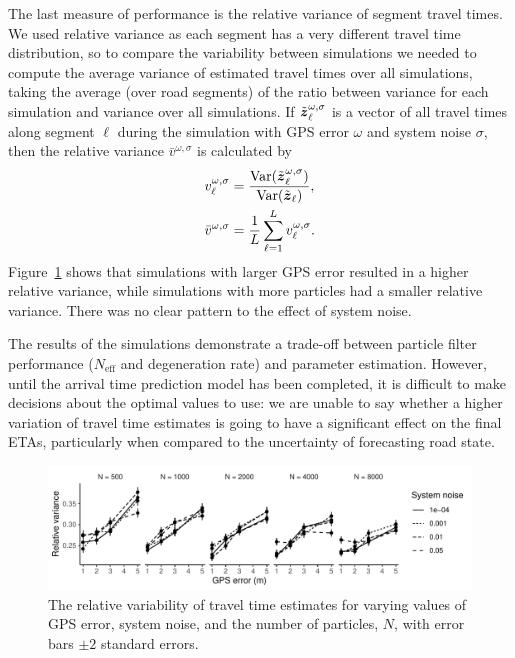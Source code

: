 The last measure of performance is the relative variance of segment travel times.
We used relative variance as each segment has a very different travel time distribution,
so to compare the variability between simulations we needed to
compute the average variance of estimated travel times over all simulations,
taking the average (over road segments) of the ratio between variance for
each simulation and variance over all simulations.
If $\tilde {\boldsymbol{z}}_\ell^{\omega,\sigma}$ is a vector of all travel times
along segment $\ell$ during the simulation with GPS error $\omega$ and system noise $\sigma$,
then the relative variance $\bar v^{\omega,\sigma}$ is calculated by
\begin{equation*}
\begin{split}
v_\ell^{\omega,\sigma} &=
\frac{\mathrm{Var}(\tilde {\boldsymbol{z}}_\ell^{\omega,\sigma})}{\mathrm{Var}(\tilde {\boldsymbol{z}}_\ell)}, \\
\bar v^{\omega,\sigma} &=
    \frac{1}{L}\sum_{\ell=1}^L v_\ell^{\omega,\sigma}.
\end{split}
\end{equation*}
Figure~\ref{fig:travel_times} shows that simulations with larger GPS error
resulted in a higher relative variance,
while simulations with more particles had a smaller relative variance.
There was no clear pattern to the effect of system noise.


The results of the simulations
demonstrate a trade-off between particle filter performance
($N_\text{eff}$ and degeneration rate) and parameter estimation.
However, until the arrival time prediction model has been completed,
it is difficult to make decisions about the optimal values to use:
we are unable to say whether a higher variation of travel time estimates
is going to have a significant effect on the final ETAs,
particularly when compared to the uncertainty of forecasting road state.


\begin{figure}[tb]
    \centering
    \includegraphics[width=\textwidth]{figures/04_model_results_times.pdf}
    \caption{
        The relative variability of travel time estimates for varying
        values of GPS error, system noise, and the number of particles, $N$,
        with error bars $\pm 2$ standard errors.
    }
    \label{fig:travel_times}
\end{figure}
